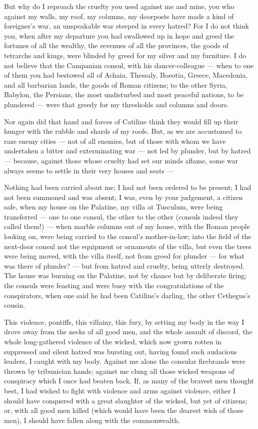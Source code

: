  But why do I reproach the cruelty you used against me and mine, you who against my walls, my roof, my columns, my doorposts have made a kind of foreigner's war, an unspeakable war steeped in every hatred? For I do not think you, when after my departure you had swallowed up in hope and greed the fortunes of all the wealthy, the revenues of all the provinces, the goods of tetrarchs and kings, were blinded by greed for my silver and my furniture. I do not believe that the Campanian consul, with his dancer-colleague --- when to one of them you had bestowed all of Achaia, Thessaly, Boeotia, Greece, Macedonia, and all barbarian lands, the goods of Roman citizens; to the other Syria, Babylon, the Persians, the most undisturbed and most peaceful nations, to be plundered --- were that greedy for my thresholds and columns and doors.

 Nor again did that hand and forces of Catiline think they would fill up their hunger with the rubble and shards of my roofs. But, as we are accustomed to raze enemy cities --- not of all enemies, but of those with whom we have undertaken a bitter and exterminating war --- not led by plunder, but by hatred --- because, against those whose cruelty had set our minds aflame, some war always seems to settle in their very houses and seats ---

 Nothing had been carried about me; I had not been ordered to be present; I had not been summoned and was absent; I was, even by your judgement, a citizen safe, when my house on the Palatine, my villa at Tusculum, were being transferred --- one to one consul, the other to the other (consuls indeed they called them!) --- when marble columns out of my house, with the Roman people looking on, were being carried to the consul's mother-in-law; into the field of the next-door consul not the equipment or ornaments of the villa, but even the trees were being moved, with the villa itself, not from greed for plunder --- for what was there of plunder? --- but from hatred and cruelty, being utterly destroyed. The house was burning on the Palatine, not by chance but by deliberate firing; the consuls were feasting and were busy with the congratulations of the conspirators, when one said he had been Catiline's darling, the other Cethegus's cousin.

 This violence, pontiffs, this villainy, this fury, by setting my body in the way I drove away from the necks of all good men, and the whole assault of discord, the whole long-gathered violence of the wicked, which now grown rotten in suppressed and silent hatred was bursting out, having found such audacious leaders, I caught with my body. Against me alone the consular firebrands were thrown by tribunician hands; against me clung all those wicked weapons of conspiracy which I once had beaten back. If, as many of the bravest men thought best, I had wished to fight with violence and arms against violence, either I should have conquered with a great slaughter of the wicked, but yet of citizens; or, with all good men killed (which would have been the dearest wish of those men), I should have fallen along with the commonwealth.


